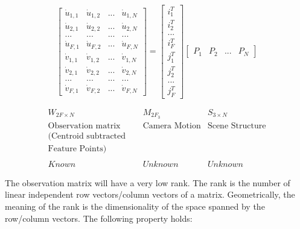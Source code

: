 \documentclass{article}
\begin{document}
\begin{equation*}
    \begin{bmatrix}
        \dot u_{1,1} & \dot u_{1,2} & ... & \dot u_{1,N} \\
        \dot u_{2,1} & \dot u_{2,2} & ... & \dot u_{2,N} \\
        ... & ... & ... & ... \\
        \dot u_{F,1} & \dot u_{F,2} & ... & \dot u_{F,N} \\
        \dot v_{1,1} & \dot v_{1,2} & ... & \dot v_{1,N} \\
        \dot v_{2,1} & \dot v_{2,2} & ... & \dot v_{2,N} \\
        ... & ... & ... & ... \\
        \dot v_{F,1} & \dot v_{F,2} & ... & \dot v_{F,N}
    \end{bmatrix}
    =
    \begin{bmatrix}
        i_1^T \\
        i_2^T \\
        ... \\
        i_F^T \\
        j_1^T \\
        j_2^T \\
        ... \\
        j_F^T
    \end{bmatrix}
    \begin{bmatrix}
        P_1 & P_2 & ... & P_N
    \end{bmatrix}
\end{equation*}

\begin{equation*}
    \begin{matrix}
        W_{2F\times N} & \ \ & M_{2F_3} & S_{3\times N} \\
        \text{Observation matrix} & \ \ & \text{Camera Motion} & \text{Scene Structure} \\
        \text{(Centroid subtracted} & \ \ & \ \ & \ \ \\
        \text{Feature Points)} & \ \ & \ \ & \ \ \\
        \ \ & \ \ & \ \ & \ \ \\
        Known & \ \ & Unknown & Unknown
    \end{matrix}
\end{equation*}

The observation matrix will have a very low rank. The rank is the number of linear independent row vectors/column vectors of a matrix. Geometrically, the meaning of the rank is the dimensionality of the space spanned by the row/column vectors. The following property holds:
\end{document}
